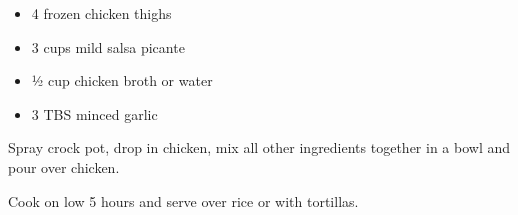 
\ingredients
\begin{itemize}
        \item 4 frozen chicken thighs
        \item 3 cups mild salsa picante
        \item ½ cup chicken broth or water
        \item 3 TBS minced garlic
\end{itemize}

\instructions

Spray crock pot, drop in chicken, mix all other ingredients together in
a bowl and pour over chicken.

Cook on low 5 hours and serve over rice or with tortillas.
